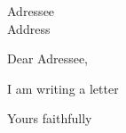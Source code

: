 \documentclass{letter}
\begin{document}
\begin{letter}{Adressee \\ Address}
\opening{Dear Adressee,}
I am writing a letter
\closing{Yours faithfully}
\end{letter}
\end{document}
